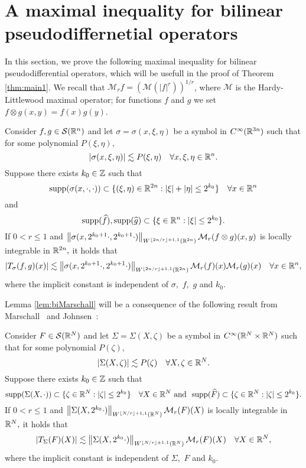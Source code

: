 \section{A maximal inequality for bilinear pseudodiffernetial operators}\label{sec:maximal_ineq}

In this section, we prove the following maximal inequality for bilinear pseudodifferential operators, which will be usefull in the proof of Theorem \ref{thm:main1}. We recall that $\mathcal{M}_r f = \left( \mathcal{M}(|f|^r)\right)^{1/r}$, where $\mathcal{M}$ is the Hardy-Littlewood maximal operator; for functions $f$ and $g$ we set $f\otimes g (x,y) = f(x)g(y)$.  \

\begin{lemma}\label{lem:biMarschall}  Consider $f,g\in{\mathcal{S}}({{\mathbb R}^n})$  and let $\sigma=\sigma(x,\xi,\eta)$ be a  symbol in $C^\infty(\mathbb{R}^{3n})$ 
such that for some polynomial $P(\xi,\eta),$
\[
\left\vert \sigma(x,\xi,\eta) \right\vert\lesssim P(\xi,\eta)\quad \forall x,\xi,\eta\in{{\mathbb R}^n}.
\]
Suppose there exists $k_0\in\mathbb{Z}$  such that
$$
{\rm{supp}}(\sigma(x, \cdot, \cdot)) \subset \{(\xi, \eta) \in \mathbb{R}^{2n}: |\xi| + |\eta| \le 2^{k_0}\}\quad \forall x\in{{\mathbb R}^n}
$$
and 
$$
{\rm{supp}}(\widehat{f}), {\rm{supp}}(\widehat{g}) \subset \{\xi \in \mathbb{R}^{n}: |\xi| \le 2^{k_0}\}.
$$
If $0< r\le1$ and $\left\|\sigma(x, 2^{k_0+1} \cdot, 2^{k_0+1} \cdot)\right\|_{W^{\lfloor{2n/r}\rfloor + 1,1}(\mathbb{R}^{2n})} \mathcal{M}_r(f\otimes g)(x,y) $ is locally integrable in $\mathbb{R}^{2n},$ it holds that
\begin{equation}\label{eq:biMarschall}
|T_{\sigma}(f,g)(x)| \lesssim  \left\|\sigma(x, 2^{k_0+1} \cdot, 2^{k_0+1} \cdot)\right\|_{W^{\lfloor{2n/r}\rfloor + 1,1}(\mathbb{R}^{2n})} \mathcal{M}_r(f)(x) \mathcal{M}_r(g)(x) \quad \forall x \in {{\mathbb R}^n},
\end{equation}
where the implicit constant is independent of $\sigma,$  $f,$ $g$ and $k_0.$
\end{lemma}

Lemma \ref{lem:biMarschall} will be a consequence of the following result from Marschall~\cite[p.118, Proposition 5(a)]{MR1376592} and  Johnsen~\cite[p.275, Proposition 4.1]{MR2163627}:

\begin{lem}\label{lem:Marschall} Consider $F\in \mathcal{S}(\mathbb{R}^N)$ and let $\Sigma=\Sigma(X, \zeta)$ be a  symbol in $C^\infty(\mathbb{R}^N \times \mathbb{R}^N)$ such that for some polynomial $P(\zeta),$
\[
\left\vert \Sigma(X, \zeta) \right\vert\lesssim P(\zeta)\quad \forall X,\zeta\in\mathbb{R}^N.
\]
Suppose there exists $k_0\in \mathbb{Z}$ such that
$$
{\rm{supp}} (\Sigma(X, \cdot)) \subset  \{ \zeta \in \mathbb{R}^N:  |\zeta| \le 2^{k_0}\}\quad \forall X\in \mathbb{R}^N
\text{ and }\text{ }
{\rm{supp}}(\widehat{F})  \subset  \{ \zeta \in \mathbb{R}^N:  |\zeta| \le 2^{k_0}\}.
$$
If $0<r \le 1$ and $\left\|\Sigma(X, 2^{k_0} \cdot)\right\|_{W^{\left\lfloor N/r \right\rfloor + 1 , 1}(\mathbb{R}^N)} \mathcal{M}_r(F)(X)$ is locally integrable in $\mathbb{R}^N,$ it holds that
\begin{equation}\label{eq:Marschall:N}
|T_{\Sigma}(F)(X)| \lesssim \left\|\Sigma(X, 2^{k_0} \cdot)\right\|_{W^{\left\lfloor N/r \right\rfloor + 1, 1}(\mathbb{R}^N)} \mathcal{M}_r(F)(X) \quad \forall X \in \mathbb{R}^N,
\end{equation}
where the implicit constant is independent of $\Sigma,$ $F$ and $k_0.$
\end{lem}

